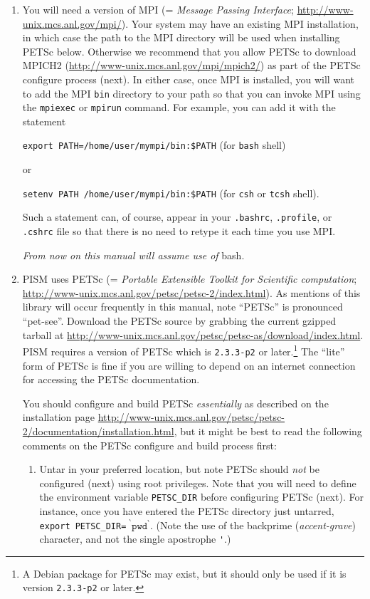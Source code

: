 \documentclass[11pt,final]{amsart}
\newcommand{\PETSCREV}{2.3.3-p2}
\begin{document}
\begin{enumerate}
\item You will need a version of MPI (= \emph{Message Passing Interface}; \url{http://www-unix.mcs.anl.gov/mpi/}).  Your system may have an existing MPI installation, in which case the path to the MPI directory will be used when installing PETSc below.  Otherwise we recommend that you allow PETSc to download MPICH2 (\url{http://www-unix.mcs.anl.gov/mpi/mpich2/}) as part of the PETSc configure process (next).  In either case, once MPI is installed, you will want to add the MPI \verb|bin| directory to your path so that you can invoke MPI using the \verb|mpiexec| or \verb|mpirun| command.  For example, you can add it with the statement

\verb|export PATH=/home/user/mympi/bin:$PATH|  \qquad (for \verb|bash| shell)

\noindent or

\verb|setenv PATH /home/user/mympi/bin:$PATH|  \qquad (for \verb|csh| or \verb|tcsh| shell).

\noindent Such a statement can, of course, appear in your \verb|.bashrc|, \verb|.profile|, or \verb|.cshrc| file so that there is no need to retype it each time you use MPI.

\medskip
\centerline{\emph{From now on this manual will assume use of} bash.}
\medskip

\item PISM uses PETSc (= \emph{Portable Extensible Toolkit for Scientific computation}; \url{http://www-unix.mcs.anl.gov/petsc/petsc-2/index.html}).  As mentions of this library will occur frequently in this manual, note ``PETSc'' is pronounced ``pet-see''.  Download the PETSc source by grabbing the current gzipped tarball at \url{http://www-unix.mcs.anl.gov/petsc/petsc-as/download/index.html}.  PISM requires a version of PETSc which is \texttt{\PETSCREV} or later.\footnote{A Debian package for PETSc may exist, but it should only be used if it is version \texttt{\PETSCREV} or later.}   The ``lite'' form of PETSc is fine if you are willing to depend on an internet connection for accessing the PETSc documentation. 

You should configure and build PETSc \emph{essentially} as described on the installation page \url{http://www-unix.mcs.anl.gov/petsc/petsc-2/documentation/installation.html}, but it might be best to read the following comments on the PETSc configure and build process first:

\renewcommand{\labelenumii}{(\roman{enumii})}\begin{enumerate}
\item Untar in your preferred location, but note PETSc should \emph{not} be configured (next) using root privileges.  Note that you will need to define the environment variable \verb|PETSC_DIR| before configuring PETSc (next).  For instance, once you have entered the PETSc directory just untarred, \verb|export PETSC_DIR=|$\phantom{!}^\backprime \mathtt{pwd}^\backprime$.  (Note the use of the backprime (\emph{accent-grave}) character, and not the single apostrophe \verb|'|.)


\end{enumerate}
\end{enumerate}
\end{document}
